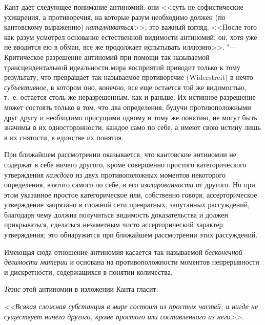 Кант дает следующее понимание антиномий: они <<суть не софистические
ухищрения, а противоречия, на которые разум необходимо должен (по
кантовскому выражению) {\em наталкиваться}>>; это важный
взгляд. <<После того как разум усмотрел основание естественной видимости
антиномий, он, хотя уже не вводится ею в обман, все же продолжает
испытывать иллюзию>>. "--- Критическое разрешение
антиномий при помощи так называемой трансцендентальной идеальности мира
восприятий приводит только к тому результату, что превращает так называемое
противоречие (Widerstreit) в нечто {\em субъективное},
в котором оно, конечно, все еще остается той же видимостью, т.~е. остается
столь же неразрешенным, как и раньше. Их истинное разрешение может состоять
только в том, что два определения, будучи противоположными друг другу и
необходимо присущими одному и тому же понятию, не могут быть значимы в их
односторонности, каждое само по себе, а имеют свою истину лишь в их
снятости, в единстве их понятия.

При ближайшем рассмотрении оказывается, что кантовские антиномии не содержат
в себе ничего другого, кроме совершенно простого категорического
утверждения {\em каждого} из двух противоположных
моментов некоторого определения, взятого самого по себе, в его
{\em изолированности} от другого. Но при этом указанное
простое категорическое или, собственно говоря, ассерторическое утверждение
запрятано в сложной сети превратных, запутанных рассуждений, благодаря чему
должна получиться видимость доказательства и должен прикрываться, сделаться
незаметным чисто ассерторический характер утверждения; это обнаружится при
ближайшем рассмотрении этих рассуждений.

Имеющая сюда отношение антиномия касается так называемой
{\em бесконечной делимости материи} и основана на
противоположности моментов непрерывности и дискретности, содержащихся в
понятии количества.

{\em Тезис} этой антиномии в изложении Канта гласит:

{\em <<Всякая сложная субстанция в мире состоит из
простых частей, и нигде не существует ничего другого, кроме простого или
составленного из него>>.}

